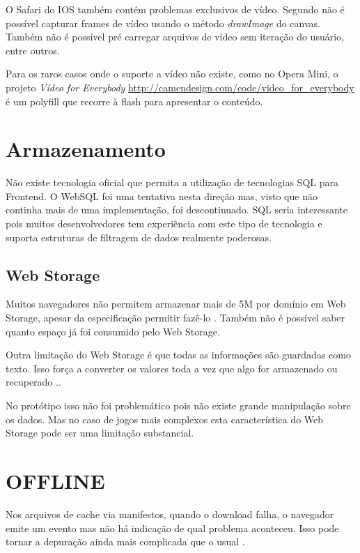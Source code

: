 O Safari do IOS também contém problemas exclusivos de vídeo. Segundo
\cite{unsolvedMediaHtmlIssues} não é possível capturar frames de
vídeo usando o método \textit{drawImage} do canvas. Também não é
possível pré carregar arquivos de vídeo sem iteração do usuário, entre outros.

Para os raros casos onde o suporte a vídeo não existe,
como no Opera Mini, o projeto \textit{Vídeo for Everybody}
\url{http://camendesign.com/code/video_for_everybody} é um polyfill que
recorre à flash para apresentar o conteúdo.

\section{Armazenamento}

Não existe tecnologia oficial que permita a utilização de tecnologias
SQL para Frontend. O WebSQL foi uma tentativa nesta direção mas, visto
que não continha mais de uma implementação, foi descontinuado. SQL seria 
interessante pois muitos desenvolvedores tem experiência  com este tipo de tecnologia
e suporta estruturas de filtragem de dados realmente poderosas.

\subsection{Web Storage}

Muitos navegadores não permitem armazenar mais de 5M por domínio
em Web Storage, apesar da especificação permitir fazê-lo
\autocite{gameAssetManagement}. Também não é possível saber
quanto espaço já foi consumido pelo Web Storage.

Outra limitação do Web Storage é que todas as informações são
guardadas como texto. Isso força a converter os valores toda a vez que
algo for armazenado ou recuperado \autocite{gameAssetManagement}..

No protótipo isso não foi problemático pois não existe grande
manipulação sobre os dados. Mas no caso de jogos mais complexos esta
característica do Web Storage pode ser uma limitação substancial.

\section{OFFLINE}

Nos arquivos de cache via manifestos, quando o download falha, o
navegador emite um evento mas não há indicação de qual problema
aconteceu. Isso pode tornar a depuração ainda mais complicada que o
usual \autocite{diveIntohtml}. 

